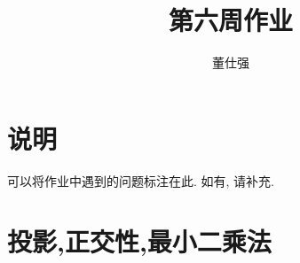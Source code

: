 \documentclass[11pt]{ctexart}
\title{第六周作业}
\author{董仕强}
\theoremstyle{definition}
\numberwithin{equation}{section}
\begin{document}
\maketitle

\section{说明}

可以将作业中遇到的问题标注在此. 如有, 请补充.

\tableofcontents

\newpage


\section{投影,正交性,最小二乘法}
\end{document}
